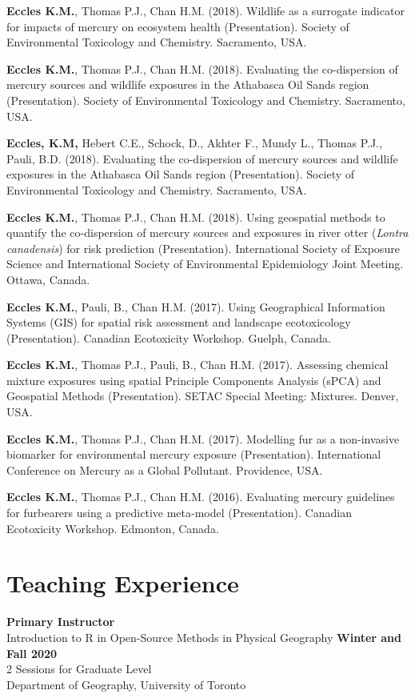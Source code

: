 \documentclass[margin,line]{res}
\begin{document}
\begin{resume}
\textbf{Eccles K.M.}, Thomas P.J., Chan H.M. (2018). Wildlife as a surrogate indicator for impacts of mercury on ecosystem health (Presentation). Society of Environmental Toxicology and Chemistry. Sacramento, USA.

\textbf{Eccles K.M.}, Thomas P.J., Chan H.M. (2018). Evaluating the co-dispersion of mercury sources and wildlife exposures in the Athabasca Oil Sands region (Presentation). Society of Environmental Toxicology and Chemistry. Sacramento, USA.

\textbf{Eccles, K.M,} Hebert C.E., Schock, D., Akhter F., Mundy L., Thomas P.J., Pauli, B.D. (2018). Evaluating the co-dispersion of mercury sources and wildlife exposures in the Athabasca Oil Sands region (Presentation). Society of Environmental Toxicology and Chemistry. Sacramento, USA.

\textbf{Eccles K.M.}, Thomas P.J., Chan H.M. (2018). Using geospatial methods to quantify the co-dispersion of mercury sources and exposures in river otter (\textit{Lontra canadensis}) for risk prediction (Presentation). International Society of Exposure Science and International Society of Environmental Epidemiology Joint Meeting. Ottawa, Canada.

\textbf{Eccles K.M.}, Pauli, B., Chan H.M. (2017). Using Geographical Information Systems (GIS) for spatial risk assessment and landscape ecotoxicology (Presentation). Canadian Ecotoxicity Workshop. Guelph, Canada.

\textbf{Eccles K.M.}, Thomas P.J., Pauli, B., Chan H.M. (2017). Assessing chemical mixture exposures using spatial Principle Components Analysis (sPCA) and Geospatial Methods (Presentation). SETAC Special Meeting: Mixtures. Denver, USA.

\textbf{Eccles K.M.}, Thomas P.J., Chan H.M. (2017).  Modelling fur as a non-invasive biomarker for environmental mercury exposure (Presentation). International Conference on Mercury as a Global Pollutant. Providence, USA.

\textbf{Eccles K.M.}, Thomas P.J., Chan H.M. (2016). Evaluating mercury guidelines for furbearers using a predictive meta-model (Presentation). Canadian Ecotoxicity Workshop. Edmonton, Canada.
\\

\vspace*{.1in}

\section{\sc Teaching Experience}
\textbf{Primary Instructor}\\
Introduction to R in Open-Source Methods in Physical Geography  \hfill {\textbf{Winter and Fall 2020}}\\
2 Sessions for Graduate Level\\
Department of Geography, University of Toronto


\end{resume}
\end{document}
